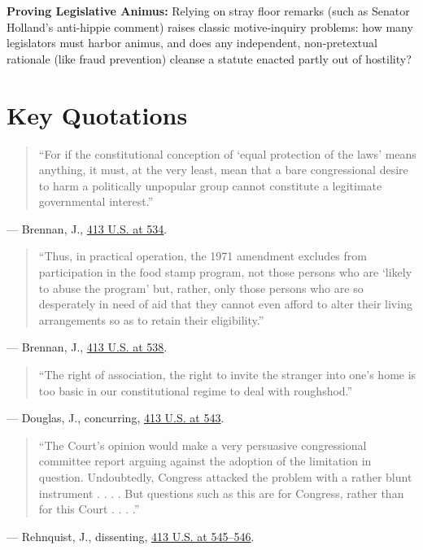 \documentclass[12pt]{article}
\begin{document}
\textbf{Proving Legislative Animus:} Relying on stray floor remarks (such as Senator Holland's anti-hippie comment) raises classic motive-inquiry problems: how many legislators must harbor animus, and does any independent, non-pretextual rationale (like fraud prevention) cleanse a statute enacted partly out of hostility?

\section{Key Quotations}
\begin{quote}
``For if the constitutional conception of `equal protection of the laws' means anything, it must, at the very least, mean that a bare congressional desire to harm a politically unpopular group cannot constitute a legitimate governmental interest.''
\end{quote}
\noindent --- Brennan, J., \href{https://supreme.justia.com/cases/federal/us/413/528/}{413 U.S. at 534}.

\begin{quote}
``Thus, in practical operation, the 1971 amendment excludes from participation in the food stamp program, not those persons who are `likely to abuse the program' but, rather, only those persons who are so desperately in need of aid that they cannot even afford to alter their living arrangements so as to retain their eligibility.''
\end{quote}
\noindent --- Brennan, J., \href{https://supreme.justia.com/cases/federal/us/413/528/}{413 U.S. at 538}.

\begin{quote}
``The right of association, the right to invite the stranger into one's home is too basic in our constitutional regime to deal with roughshod.''
\end{quote}
\noindent --- Douglas, J., concurring, \href{https://supreme.justia.com/cases/federal/us/413/528/}{413 U.S. at 543}.

\begin{quote}
``The Court's opinion would make a very persuasive congressional committee report arguing against the adoption of the limitation in question. Undoubtedly, Congress attacked the problem with a rather blunt instrument . . . . But questions such as this are for Congress, rather than for this Court . . . .''
\end{quote}
\noindent --- Rehnquist, J., dissenting, \href{https://supreme.justia.com/cases/federal/us/413/528/}{413 U.S. at 545--546}.
\end{document}
